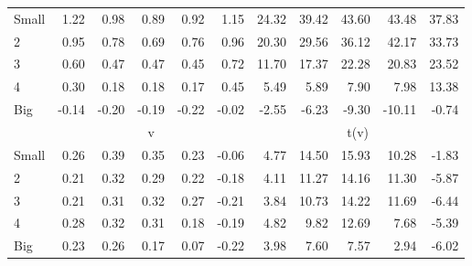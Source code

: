 \begin{table}[!ht]
\begin{tabular}{lrrrrrrrrrr}
    \\
      \cmidrule(r){2-6} \cmidrule(r){7-11}

    Small   & 1.22  & 0.98  & 0.89  & 0.92  & 1.15  & 24.32  & 39.42  & 43.60  & 43.48  & 37.83  \\
         2  & 0.95  & 0.78  & 0.69  & 0.76  & 0.96  & 20.30  & 29.56  & 36.12  & 42.17  & 33.73  \\
         3  & 0.60  & 0.47  & 0.47  & 0.45  & 0.72  & 11.70  & 17.37  & 22.28  & 20.83  & 23.52  \\
         4  & 0.30  & 0.18  & 0.18  & 0.17  & 0.45  & 5.49  & 5.89  & 7.90  & 7.98  & 13.38  \\
    Big     & -0.14  & -0.20  & -0.19  & -0.22  & -0.02  & -2.55  & -6.23  & -9.30  & -10.11  & -0.74  \\

  
    
      & \multicolumn{5}{c}{v} & \multicolumn{5}{c}{t(v)}
    
    \\
      \cmidrule(r){2-6} \cmidrule(r){7-11}

    Small   & 0.26  & 0.39  & 0.35  & 0.23  & -0.06  & 4.77  & 14.50  & 15.93  & 10.28  & -1.83  \\
         2  & 0.21  & 0.32  & 0.29  & 0.22  & -0.18  & 4.11  & 11.27  & 14.16  & 11.30  & -5.87  \\
         3  & 0.21  & 0.31  & 0.32  & 0.27  & -0.21  & 3.84  & 10.73  & 14.22  & 11.69  & -6.44  \\
         4  & 0.28  & 0.32  & 0.31  & 0.18  & -0.19  & 4.82  & 9.82  & 12.69  & 7.68  & -5.39  \\
    Big     & 0.23  & 0.26  & 0.17  & 0.07  & -0.22  & 3.98  & 7.60  & 7.57  & 2.94  & -6.02  \\

  

  \bottomrule
\end{tabular}
\label{tbl:25_Size_Prior_FF1993}
\end{table}